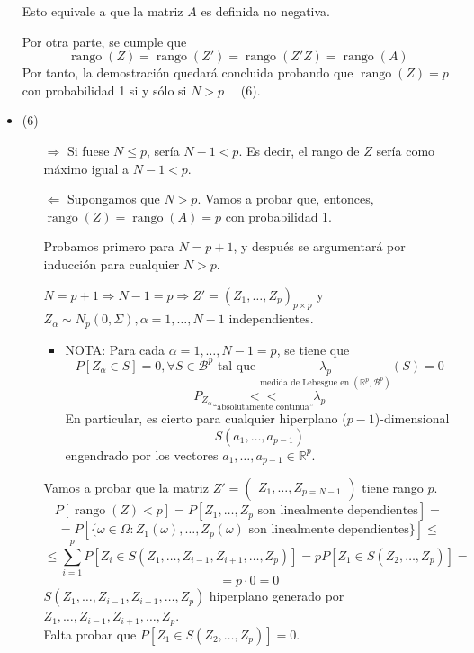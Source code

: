 \documentclass[11pt,a4paper]{article}
\begin{document}
\begin{itemize}
Esto equivale a que la matriz $A$ es definida no negativa.

Por otra parte, se cumple que
$$\operatorname{rango}(Z) = \operatorname{rango}(Z') = \operatorname{rango}(Z'Z) = \operatorname{rango}(A)$$
Por tanto, la demostración quedará concluida probando que $\operatorname{rango}(Z) = p$ con probabilidad 1 si y sólo si $N > p \quad$ (6).

\item (6) \begin{itemize}
\item[$\Rightarrow$] Si fuese $N \leq p$, sería $N-1 < p$. Es decir, el rango de $Z$ sería como máximo igual a $N - 1 < p$.
\item[$\Leftarrow$] Supongamos que $N > p$. Vamos a probar que, entonces, $\operatorname{rango}(Z) = \operatorname{rango}(A) = p$ con probabilidad 1.

Probamos primero para $N = p+1$, y después se argumentará por inducción para cualquier $N > p$.

$N = p + 1 \Rightarrow N - 1 = p \Rightarrow Z' = (Z_{1}, \dots, Z_{p})_{p \times p}$ y $Z_{\alpha} \sim N_{p}(0, \Sigma), \alpha = 1, \dots, N-1$ independientes.

\begin{itemize}
\item NOTA: Para cada $\alpha = 1, \dots, N-1 = p$, se tiene que
$$P[Z_{\alpha} \in S] = 0, \forall S \in \mathcal{B}^{p} \text{ tal que } \underset{\text{medida de Lebesgue en } (\mathbb{R}^{p}, \mathcal{B}^{p})}{\lambda_{p}}(S) = 0$$
$$P_{Z_{\alpha}} \underset{\text{``absolutamente continua''}}{<<} \lambda_{p}$$
En particular, es cierto para cualquier hiperplano ($p-1$)-dimensional
$$S(a_{1}, \dots, a_{p-1})$$
engendrado por los vectores $a_{1}, \dots, a_{p-1} \in \mathbb{R}^{p}$.
\end{itemize}

Vamos a probar que la matriz $Z' = \begin{pmatrix} Z_{1}, \dots, Z_{p=N-1} \end{pmatrix}$ tiene rango $p$.
$$P[\operatorname{rango}(Z) < p] = P[Z_{1}, \dots, Z_{p} \text{ son linealmente dependientes}]=$$
$$= P[\{\omega \in \Omega: Z_{1}(\omega), \dots, Z_{p}(\omega) \text{ son linealmente dependientes}\}] \leq$$
$$\leq \sum_{i=1}^{p}P[Z_{i} \in S(Z_{1}, \dots, Z_{i-1}, Z_{i+1}, \dots, Z_{p})] = pP[Z_{1} \in S(Z_{2}, \dots, Z_{p})] =$$
$$= p \cdot 0 = 0$$
$S(Z_{1}, \dots, Z_{i-1}, Z_{i+1}, \dots, Z_{p})$ hiperplano generado por $Z_{1}, \dots, Z_{i-1}, Z_{i+1}, \dots, Z_{p}$. \\
Falta probar que $P[Z_{1} \in S(Z_{2}, \dots, Z_{p})] = 0$.


\end{itemize}
\end{itemize}
\end{document}
